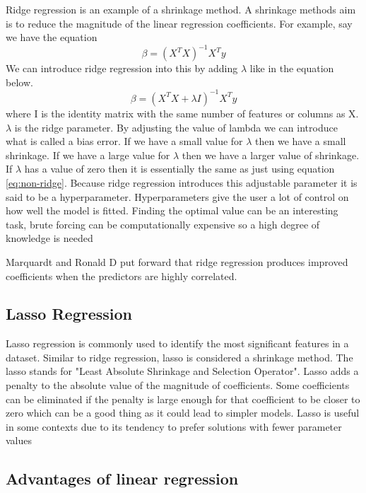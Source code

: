 Ridge regression is an example of a shrinkage method. A shrinkage methods aim is to reduce the magnitude of the linear regression coefficients. For example, say we have the equation
\begin{equation}\label{eq:non-ridge}
\beta = (X^T X)^{-1}X^T y
\end{equation}
We can introduce ridge regression into this by adding $\lambda$ like in the equation below.
\begin{equation}
\beta = (X^T X + \lambda I)^{-1}X^T y
\end{equation}
where I is the identity matrix with the same number of features or columns as X. $\lambda$ is the ridge parameter. By adjusting the value of lambda we can introduce what is called a bias error. If we have a small value for $\lambda$ then we have a small shrinkage. If we have a large value for $\lambda$ then we have a larger value of shrinkage. If $\lambda$ has a value of zero then it is essentially the same as just using equation \ref{eq:non-ridge}. Because ridge regression introduces this adjustable parameter it is said to be a hyperparameter. Hyperparameters give the user a lot of control on how well the model is fitted. Finding the optimal value can be an interesting task, brute forcing can be computationally expensive so a high degree of knowledge is needed

Marquardt and Ronald D\cite{doi:10.1080/00031305.1975.10479105} put forward that ridge regression produces improved coefficients when the predictors are highly correlated. 

\subsection{Lasso Regression}

Lasso regression is commonly used to identify the most significant features in a dataset. Similar to ridge regression, lasso is considered a shrinkage method. The lasso stands for "Least Absolute Shrinkage and Selection Operator". Lasso adds a penalty to the absolute value of the magnitude of coefficients. Some coefficients can be eliminated if the penalty is large enough for that coefficient to be closer to zero which can be a good thing as it could lead to simpler models. Lasso is useful in some contexts due to its tendency to prefer solutions with fewer parameter values \cite{lassoAdvantage1}

\subsection{Advantages of linear regression}

